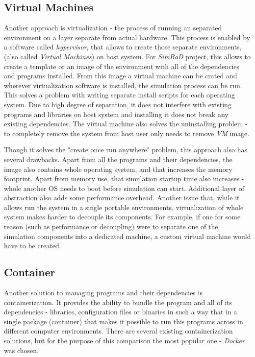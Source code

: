 \subsection{Virtual Machines}
Another approach is virtualization - the process of running an separated environment on a layer separate from actual hardware. This process is enabled by a software called \textit{hypervisor}, that allows to create those separate environments, (also called \textit{Virtual Machines}) on host system. For \textit{SimBaD} project, this allows to create a template or an image of the environment with all of the dependencies and programs installed. From this image a virtual machine can be crated and wherever virtualization software is installed, the simulation process can be run. This solves a problem with writing separate install scripts for each operating system. Due to high degree of separation, it does not interfere with existing programs and libraries on host system and installing it does not break any existing dependencies. The virtual machine also solves the uninstalling problem - to completely remove the system from host user only needs to remove \textit{VM} image. 

Though it solves the "create once run anywhere" problem, this approach also has several drawbacks. Apart from all the programs and their dependencies, the image also contains whole operating system, and that increases the memory footprint. Apart from memory use, that simulation startup time also increases - whole another OS needs to boot before simulation can start. Additional layer of abstraction also adds some performance overhead. Another issue that, while it allows run the system in a single portable environments, virtualization of whole system makes harder to decouple its components. For example, if one for some reason (such as performance or decoupling) were to separate one of the simulation components into a dedicated machine, a custom virtual machine would have to be created. 
\subsection{Container}
Another solution to managing programs and their dependencies is containerization. It provides the ability to bundle the program and all of its dependencies - libraries, configuration files or binaries in such a way that in a single package (container) that makes it possible to run this programs across in different computer environments. There are several existing containerization solutions, but for the purpose of this comparison the most popular one - \textit{Docker} was chosen.

